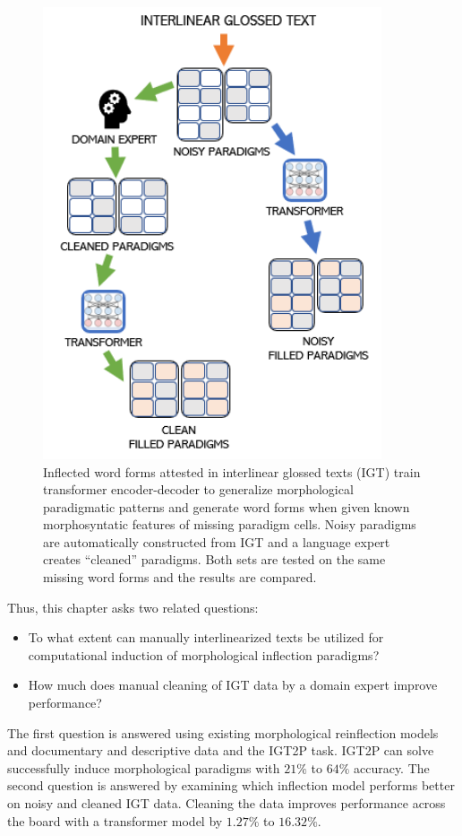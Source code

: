 \begin{figure}
    \centering
    \includegraphics[width=10cm]{figs/IGT-Paradigm-Workflow.png}
    \caption[IGT2P Overview]{Inflected word forms attested in interlinear glossed texts (IGT) train transformer encoder-decoder to generalize morphological paradigmatic patterns and generate word forms when given known morphosyntatic features of missing paradigm cells. Noisy paradigms are automatically constructed from IGT and a language expert creates ``cleaned'' paradigms. Both sets are tested on the same missing word forms and the results are compared.}
    \label{fig:Workflow}
\end{figure}


Thus, this chapter asks two related questions: 
\begin{itemize}
    \item To what extent can manually interlinearized texts be utilized for computational induction of morphological inflection paradigms? 
    \item How much does manual cleaning of IGT data by a domain expert improve performance?
\end{itemize}

The first question is answered using existing morphological reinflection models and documentary and descriptive data and the IGT2P task. IGT2P can solve successfully induce morphological paradigms with $21\%$ to $64\%$ accuracy. The second question is answered by examining which inflection model performs better on noisy and cleaned IGT data. Cleaning the data improves performance across the board with a transformer model by $1.27\%$ to $16.32\%$. 

